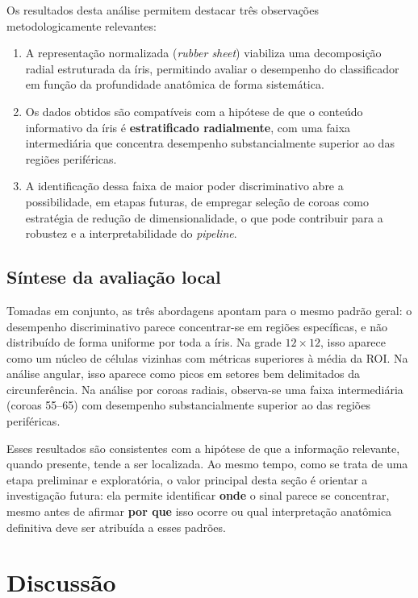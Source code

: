 \documentclass[11pt,a4paper]{article}
\begin{document}
Os resultados desta análise permitem destacar três observações metodologicamente relevantes:
\begin{enumerate}
    \item A representação normalizada (\textit{rubber sheet}) viabiliza uma decomposição radial estruturada da íris, permitindo avaliar o desempenho do classificador em função da profundidade anatômica de forma sistemática.
    \item Os dados obtidos são compatíveis com a hipótese de que o conteúdo informativo da íris é \textbf{estratificado radialmente}, com uma faixa intermediária que concentra desempenho substancialmente superior ao das regiões periféricas.
    \item A identificação dessa faixa de maior poder discriminativo abre a possibilidade, em etapas futuras, de empregar seleção de coroas como estratégia de redução de dimensionalidade, o que pode contribuir para a robustez e a interpretabilidade do \textit{pipeline}.
\end{enumerate}

\subsection{Síntese da avaliação local}
Tomadas em conjunto, as três abordagens apontam para o mesmo padrão geral: o desempenho discriminativo parece concentrar-se em regiões específicas, e não distribuído de forma uniforme por toda a íris. Na grade \(12\times 12\), isso aparece como um núcleo de células vizinhas com métricas superiores à média da ROI. Na análise angular, isso aparece como picos em setores bem delimitados da circunferência. Na análise por coroas radiais, observa-se uma faixa intermediária (coroas 55--65) com desempenho substancialmente superior ao das regiões periféricas.

Esses resultados são consistentes com a hipótese de que a informação relevante, quando presente, tende a ser localizada. Ao mesmo tempo, como se trata de uma etapa preliminar e exploratória, o valor principal desta seção é orientar a investigação futura: ela permite identificar \textbf{onde} o sinal parece se concentrar, mesmo antes de afirmar \textbf{por que} isso ocorre ou qual interpretação anatômica definitiva deve ser atribuída a esses padrões.

\section{Discussão}
\end{document}
